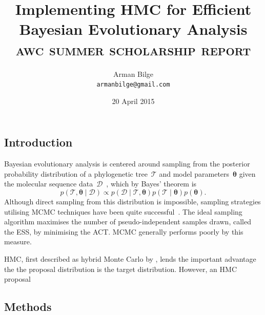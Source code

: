 \documentclass{article}
\title{Implementing \acl{HMC} for Efficient Bayesian Evolutionary Analysis \\
           \Large\textsc{awc summer scholarship report}}
\author{Arman Bilge \\ \texttt{armanbilge@gmail.com}}
\date{20 April 2015}
\renewcommand{\vec}[1]{\ensuremath{\boldsymbol{\mathbf{#1}}}}
\begin{document}
    \maketitle

    \subsection*{Introduction}

    Bayesian evolutionary analysis is centered around sampling from the
        posterior probability distribution of a phylogenetic
        tree~$\mathcal{T}$ and model parameters~$\vec\theta$
        given the molecular sequence data~$\mathcal{D}$~\cite{Bou+14},
        which by Bayes' theorem is
        \begin{equation}
            p\left(\mathcal{T}, \vec\theta \mid \mathcal{D}\right)
                \propto p\left(\mathcal{D} \mid \mathcal{T},\vec\theta\right)
                p\left(\mathcal{T} \mid \vec\theta\right) p\left(\vec\theta\right).
        \end{equation}
    Although direct sampling from this distribution is impossible, sampling
        strategies utilising \ac{MCMC} techniques have been quite
        successful~\cite{Ron+12,Dru+12,Bou+14}.
    The ideal sampling algorithm maximises the number of pseudo-independent
        samples drawn, called the \ac{ESS}, by minimising the \ac{ACT}.
    \ac{MCMC} generally performs poorly by this measure.

    \ac{HMC}, first described as hybrid Monte Carlo by \textcite{Dua+87},
        lends the important advantage the the proposal distribution is the
        target distribution.
    However, an \ac{HMC} proposal

    \subsection*{Methods}
\end{document}
